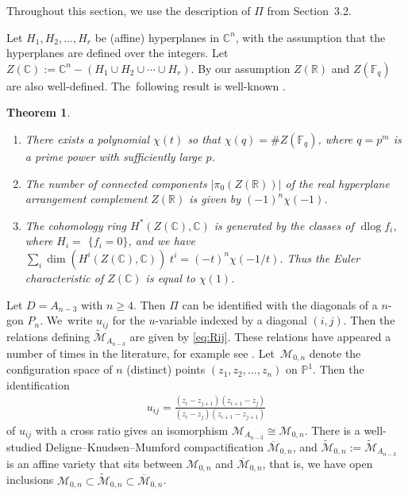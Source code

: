 \documentclass[pdftex]{sigma}%
\def\R{{\mathbb R}}
\def\C{{\mathbb C}}
\def\F{{\mathbb F}}
\def\M{{\mathcal{M}}}
\def\tM{{\widetilde {\mathcal{M}}}}
\def\bM{{\overline {\mathcal{M}}}}
\def\dlog{\operatorname{dlog}}
\renewcommand{\P}{{\mathbb P}}
\numberwithin{equation}{section}
\newtheorem{Theorem}{Theorem}[section]
\begin{document}
Throughout this section, we use the description of $\Pi$ from Section~3.2.

{\samepage\bigskip{}
Let $H_1, H_2,\dots,H_r$ be (affine) hyperplanes in $\C^n$, with the assumption that the hyperplanes are defined over the integers. Let~$Z(\C) := \C^n - (H_1 \cup H_2 \cup \cdots \cup H_r)$. By our assumption $Z(\R)$ and $Z(\F_q)$ are also well-defined. The~following result is well-known \cite{OT, Sta}.

}
\begin{Theorem} \label{thm:hyp} \
\begin{enumerate}\itemsep=0pt
\item[$1.$] There exists a polynomial $\chi(t)$ so that $\chi(q) = \#Z(\F_q)$, where $q = p^m$ is a prime power with sufficiently large $p$.
\item[$2.$] The number of connected components $|\pi_0(Z(\R))|$ of the real hyperplane arrangement complement $Z(\R)$ is given by $(-1)^n \chi(-1)$.
\item[$3.$] The cohomology ring $H^*(Z(\C),\C)$ is generated by the classes of $\dlog f_i$, where $H_i =$ \mbox{$\{f_i =0\}$}, and we have $\sum_i \dim(H^i (Z(\C),\C)) \;t^i = (-t)^n \chi(-1/t)$. Thus the Euler characteristic of $Z(\C)$ is equal to $\chi(1)$.
\end{enumerate}
\end{Theorem}

\bigskip{} %
Let $D = A_{n-3}$ with $n \geq 4$. Then $\Pi$ can be identified with the diagonals of a $n$-gon $P_n$. We~write $u_{ij}$ for the $u$-variable indexed by a diagonal $(i,j)$. Then the relations defining $\tM_{A_{n-3}}$ are given by \eqref{eq:Rij}.
These relations have appeared a number of times in the literature, for example see \cite{ABHY,Brown}. Let~$\M_{0,n}$ denote the configuration space of $n$ (distinct) points $(z_1,z_2,\dots,z_n)$ on $\P^1$. Then the identification
\begin{gather}\label{eq:uij}
u_{ij} = \frac{(z_i - z_{j+1})(z_{i+1}-z_j)}{(z_i - z_j)(z_{i+1}-z_{j+1})}
\end{gather}
of $u_{ij}$ with a cross ratio gives an isomorphism $\M_{A_{n-3}} \cong \M_{0,n}$. There is a well-studied Deligne--Knudsen--Mumford compactification $\bM_{0,n}$, and $\tM_{0,n}:=\tM_{A_{n-3}}$ is an affine variety that sits between $\M_{0,n}$ and $\bM_{0,n}$, that is, we have open inclusions $\M_{0,n} \subset \tM_{0,n} \subset \bM_{0,n}$.
\end{document}
